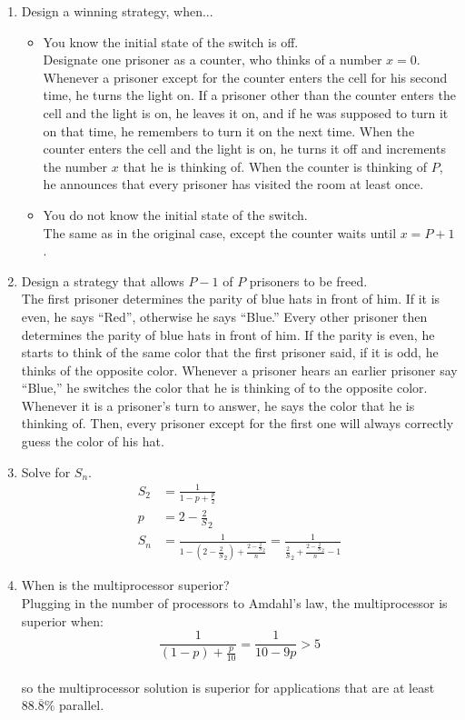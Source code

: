 \documentclass{article}
\newcommand{\num}[1]{\setcounter{enumi}{#1}}
\begin{document}
\begin{enumerate}
\item Design a winning strategy, when...
\begin{itemize}
\item You know the initial state of the switch is off.\\
Designate one prisoner as a counter, who thinks of a number $x = 0$. Whenever a prisoner except for
the counter enters the cell for his second time, he turns the light
on. If a prisoner other than the counter enters the cell and the light
is on, he leaves it on, and if he was supposed to turn it on that
time, he remembers to turn it on the next time. When the counter
enters the cell and the light is on, he turns it off and increments
the number $x$ that he is thinking of. When the counter is thinking of
$P$, he announces that every prisoner has visited the room at least once.
\item You do not know the initial state of the switch.\\
The same as in the original case, except the counter waits until $x =
P + 1$. 

\end{itemize}


\item Design a strategy that allows $P - 1$ of $P$ prisoners to be
  freed.\\
The first prisoner determines the parity of blue hats in front of
him. If it is even, he says ``Red'', otherwise he says ``Blue.'' Every other
prisoner then determines the parity of blue hats in front of
him. If the parity is even, he starts to think of the same color that
the first prisoner said, if it is odd, he thinks of the opposite
color. Whenever a prisoner hears an earlier prisoner say ``Blue,'' he
switches the color that he is thinking of to the opposite
color. Whenever it is a prisoner's turn to answer, he says the color
that he is thinking of. Then, every prisoner except for the first one
will always correctly guess the color of his hat.

\num{6}
\item Solve for $S_n$.
\begin{align*}
S_2 &= \frac 1 {1 - p + \frac p 2}\\
p &= 2 - \frac 2 S_2 \\
S_n &= \frac 1 {1 - (2 -  \frac 2 S_2) + \frac {2 - \frac 2 S_2} n}
 = \frac 1 {\frac 2 S_2 + \frac{2 - \frac 2 S_2} n - 1}
\end{align*}

\item When is the multiprocessor superior?\\
Plugging in the number of processors to Amdahl's law, the multiprocessor is superior when:
\begin{equation*}
\frac{1}{(1 - p) + \frac p {10}} = \frac 1 {10 - 9p} > 5
\end{equation*}\\
so the multiprocessor solution is superior for applications that are
at least $88.\overline{8}\%$ parallel. 


\end{enumerate}
\end{document}
